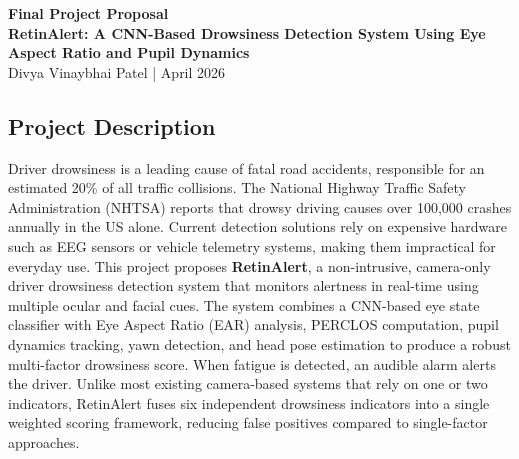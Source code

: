 \documentclass[9pt]{article}
\begin{document}
\thispagestyle{empty}

\begin{center}
    \textbf{\large Final Project Proposal}\\[3pt]
    \textbf{RetinAlert: A CNN-Based Drowsiness Detection System Using Eye Aspect Ratio and Pupil Dynamics}\\[3pt]
    Divya Vinaybhai Patel \hspace{10pt} | \hspace{10pt} April 2026
\end{center}
\vspace{-0.2cm}

\subsection*{Project Description}
Driver drowsiness is a leading cause of fatal road accidents, responsible for an estimated 20\% of all traffic collisions. The National Highway Traffic Safety Administration (NHTSA) reports that drowsy driving causes over 100,000 crashes annually in the US alone. Current detection solutions rely on expensive hardware such as EEG sensors or vehicle telemetry systems, making them impractical for everyday use. This project proposes \textbf{RetinAlert}, a non-intrusive, camera-only driver drowsiness detection system that monitors alertness in real-time using multiple ocular and facial cues. The system combines a CNN-based eye state classifier with Eye Aspect Ratio (EAR) analysis, PERCLOS computation, pupil dynamics tracking, yawn detection, and head pose estimation to produce a robust multi-factor drowsiness score. When fatigue is detected, an audible alarm alerts the driver. Unlike most existing camera-based systems that rely on one or two indicators, RetinAlert fuses six independent drowsiness indicators into a single weighted scoring framework, reducing false positives compared to single-factor approaches.
\end{document}
